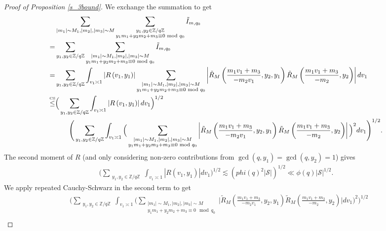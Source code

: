 \begin{proof}[{Proof of Proposition \ref{s_3bound}}]
    We exchange the summation to get \begin{align*}
    &\sum_{\substack{|m_1|\sim M_1,|m_2|,|m_3|\sim M}}\sum_{\substack{y_1,y_2 \in\mathbb{Z}/q\mathbb{Z} \\ y_1m_1+y_2m_2+m_3\equiv 0 \mod q_0}}\tilde{I}_{m,q_0}\\
    =&\sum_{\substack{y_1,y_2 \in\mathbb{Z}/q\mathbb{Z} }}\sum_{\substack{|m_1|\sim M_1,|m_2|,|m_3|\sim M\\ y_1m_1+y_2m_2+m_3\equiv 0 \mod q_0}}\tilde{I}_{m,q_0}\\
    =&\sum_{\substack{y_1,y_2 \in\mathbb{Z}/q\mathbb{Z} }}\int_{v_1\asymp 1} \left|R\left(v_1,y_1\right)\right|
    \sum_{\substack{|m_1|\sim M_1,|m_2|,|m_3|\sim M\\ y_1m_1+y_2m_2+m_3\equiv 0 \mod q_0}}\left| \tilde{R}_M\left(\frac{m_1v_1+m_3}{-m_2v_1},y_2,y_1\right)
    \tilde{R}_M\left(\frac{m_1v_1+m_3}{-m_2},y_2\right)\right| dv_1\\
    \stackon{CS}{\leq} & \Big(\sum_{\substack{y_1,y_2 \in\mathbb{Z}/q\mathbb{Z} }}\int_{v_1\asymp 1} \left|R\left(v_1,y_1\right)\right|dv_1\Big)^{1/2} 
    \\ & \quad \quad\Bigg(\sum_{\substack{y_1,y_2 \in\mathbb{Z}/q\mathbb{Z} }}\int_{v_1\asymp 1} \Big(\sum_{\substack{|m_1|\sim M_1,|m_2|,|m_3|\sim M\\ y_1m_1+y_2m_2+m_3\equiv 0 \mod q_0}}\left|\tilde{R}_M\left(\frac{m_1v_1+m_3}{-m_2v_1},y_2,y_1\right)
    \tilde{R}_M\left(\frac{m_1v_1+m_3}{-m_2},y_2\right)\right|\Big)^2 dv_1\Bigg)^{1/2}.
    \end{align*}
    The second moment of $R$ (and only considering non-zero contributions from $\gcd(q,y_1)=\gcd(q,y_2)=1$) gives \begin{align*}
        \Big(\sum_{\substack{y_1,y_2 \in\mathbb{Z}/q\mathbb{Z} }}\int_{v_1\asymp 1} \left|R\left(v_1,y_1\right)\right|dv_1\Big)^{1/2}  \lesssim (phi(q)^2 |\mathcal{S}|)^{1/2} \ll \phi(q) |\mathcal{S}|^{1/2}. 
    \end{align*}
    We apply repeated Cauchy-Schwarz in the second term to get \begin{align*}
     &   \Bigg(\sum_{\substack{y_1,y_2 \in\mathbb{Z}/q\mathbb{Z} }}\int_{v_1\asymp 1} \Big(\sum_{\substack{|m_1|\sim M_1,|m_2|,|m_3|\sim M\\ y_1m_1+y_2m_2+m_3\equiv 0 \mod q_0}}\Big|\tilde{R}_M\left(\frac{m_1v_1+m_3}{-m_2v_1},y_2,y_1\right)
    \tilde{R}_M\left(\frac{m_1v_1+m_3}{-m_2},y_2\right)\Big| dv_1\Big)^{2}\Bigg)^{1/2}\\

\end{align*}
\end{proof}
